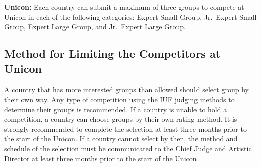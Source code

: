 \textbf{Unicon:} Each country can submit a maximum of three groups to compete at Unicon in each of the following categories: Expert Small Group, Jr.~Expert Small Group, Expert Large Group, and Jr.~Expert Large Group.

\subsection{Method for Limiting the Competitors at Unicon}
A country that has more interested groups than allowed should select group by their own way.
Any type of competition using the IUF judging methods to determine their groups is recommended.
If a country is unable to hold a competition, a country can choose groups by their own rating method.
It is strongly recommended to complete the selection at least three months prior to the start of the Unicon.
If a country cannot select by then, the method and schedule of the selection must be communicated to the Chief Judge and Artistic Director at least three months prior to the start of the Unicon.

